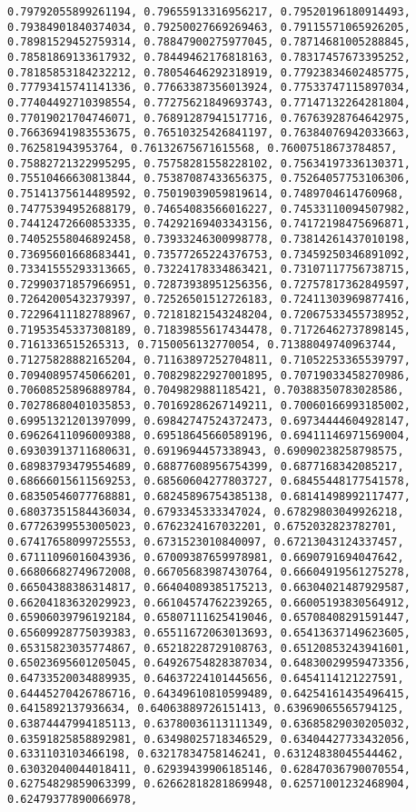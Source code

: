 \documentclass[11pt]{article}
\begin{document}
\begin{Verbatim}[commandchars=\\\{\}]
0.79792055899261194, 0.79655913316956217, 0.79520196180914493, 0.79384901840374034, 0.79250027669269463, 0.79115571065926205, 0.78981529452759314, 0.78847900275977045, 0.78714681005288845, 0.78581869133617932, 0.78449462176818163, 0.78317457673395252, 0.78185853184232212, 0.78054646292318919, 0.77923834602485775, 0.77793415741141336, 0.77663387356013924, 0.77533747115897034, 0.77404492710398554, 0.77275621849693743, 0.77147132264281804, 0.77019021704746071, 0.76891287941517716, 0.76763928764642975, 0.76636941983553675, 0.76510325426841197, 0.76384076942033663, 0.762581943953764, 0.76132675671615568, 0.76007518673784857, 0.75882721322995295, 0.75758281558228102, 0.75634197336130371, 0.75510466630813844, 0.75387087433656375, 0.75264057753106306, 0.75141375614489592, 0.75019039059819614, 0.7489704614760968, 0.74775394952688179, 0.74654083566016227, 0.74533110094507982, 0.74412472660853335, 0.74292169403343156, 0.74172198475696871, 0.74052558046892458, 0.73933246300998778, 0.73814261437010198, 0.73695601668683441, 0.73577265224376753, 0.73459250346891092, 0.73341555293313665, 0.73224178334863421, 0.73107117756738715, 0.72990371857966951, 0.72873938951256356, 0.72757817362849597, 0.72642005432379397, 0.72526501512726183, 0.72411303969877416, 0.72296411182788967, 0.72181821543248204, 0.72067533455738952, 0.71953545337308189, 0.71839855617434478, 0.71726462737898145, 0.7161336515265313, 0.7150056132770054, 0.71388049740963744, 0.71275828882165204, 0.71163897252704811, 0.71052253365539797, 0.70940895745066201, 0.70829822927001895, 0.70719033458270986, 0.70608525896889784, 0.7049829881185421, 0.70388350783028586, 0.70278680401035853, 0.70169286267149211, 0.70060166993185002, 0.69951321201397099, 0.69842747524372473, 0.69734444604928147, 0.69626411096009388, 0.69518645660589196, 0.69411146971569004, 0.69303913711680631, 0.6919694457338943, 0.69090238258798575, 0.68983793479554689, 0.68877608956754399, 0.6877168342085217, 0.68666015611569253, 0.68560604277803727, 0.68455448177541578, 0.68350546077768881, 0.68245896754385138, 0.68141498992117477, 0.68037351584436034, 0.6793345333347024, 0.67829803049926218, 0.67726399553005023, 0.6762324167032201, 0.6752032823782701, 0.67417658099725553, 0.6731523010840097, 0.67213043124337457, 0.67111096016043936, 0.67009387659978981, 0.6690791694047642, 0.66806682749672008, 0.66705683987430764, 0.66604919561275278, 0.66504388386314817, 0.66404089385175213, 0.66304021487929587, 0.66204183632029923, 0.66104574762239265, 0.66005193830564912, 0.65906039796192184, 0.65807111625419046, 0.65708408291591447, 0.65609928775039383, 0.65511672063013693, 0.65413637149623605, 0.65315823035774867, 0.65218228729108763, 0.65120853243941601, 0.65023695601205045, 0.64926754828387034, 0.64830029959473356, 0.64733520034889935, 0.64637224101445656, 0.6454114121227591, 0.64445270426786716, 0.64349610810599489, 0.64254161435496415, 0.6415892137936634, 0.64063889726151413, 0.63969065565794125, 0.63874447994185113, 0.63780036113111349, 0.63685829030205032, 0.63591825858892981, 0.63498025718346529, 0.63404427733432056, 0.6331103103466198, 0.63217834758146241, 0.63124838045544462, 0.63032040044018411, 0.62939439906185146, 0.62847036790070554, 0.62754829859063399, 0.62662818281869948, 0.62571001232468904, 0.62479377890066978, 
\end{Verbatim}
\end{document}
